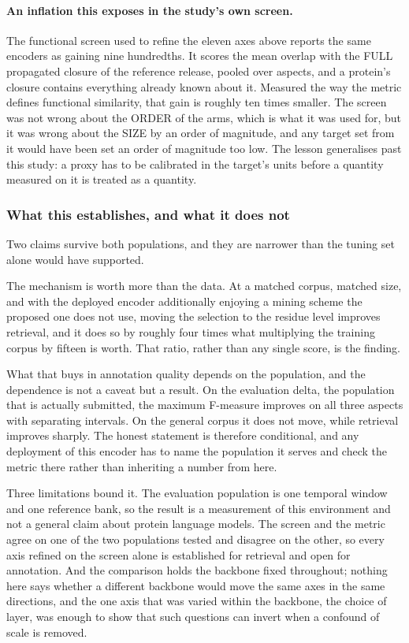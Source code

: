 \paragraph{An inflation this exposes in the study's own screen.} The functional screen
used to refine the eleven axes above reports the same encoders as gaining nine
hundredths. It scores the mean overlap with the FULL propagated closure of the
reference release, pooled over aspects, and a protein's closure contains everything
already known about it. Measured the way the metric defines functional similarity,
that gain is roughly ten times smaller. The screen was not wrong about the ORDER of
the arms, which is what it was used for, but it was wrong about the SIZE by an order
of magnitude, and any target set from it would have been set an order of magnitude too
low. The lesson generalises past this study: a proxy has to be calibrated in the
target's units before a quantity measured on it is treated as a quantity.

\subsubsection{What this establishes, and what it does not}

Two claims survive both populations, and they are narrower than the tuning set alone
would have supported.

The mechanism is worth more than the data. At a matched corpus, matched size, and with
the deployed encoder additionally enjoying a mining scheme the proposed one does not
use, moving the selection to the residue level improves retrieval, and it does so by
roughly four times what multiplying the training corpus by fifteen is worth. That
ratio, rather than any single score, is the finding.

What that buys in annotation quality depends on the population, and the dependence is
not a caveat but a result. On the evaluation delta, the population that is actually
submitted, the maximum F-measure improves on all three aspects with separating
intervals. On the general corpus it does not move, while retrieval improves sharply.
The honest statement is therefore conditional, and any deployment of this encoder has
to name the population it serves and check the metric there rather than inheriting a
number from here.

Three limitations bound it. The evaluation population is one temporal window and one
reference bank, so the result is a measurement of this environment and not a general
claim about protein language models. The screen and the metric agree on one of the two
populations tested and disagree on the other, so every axis refined on the screen
alone is established for retrieval and open for annotation. And the comparison holds the backbone fixed throughout; nothing here says
whether a different backbone would move the same axes in the same directions, and the
one axis that was varied within the backbone, the choice of layer, was enough to show
that such questions can invert when a confound of scale is removed.
